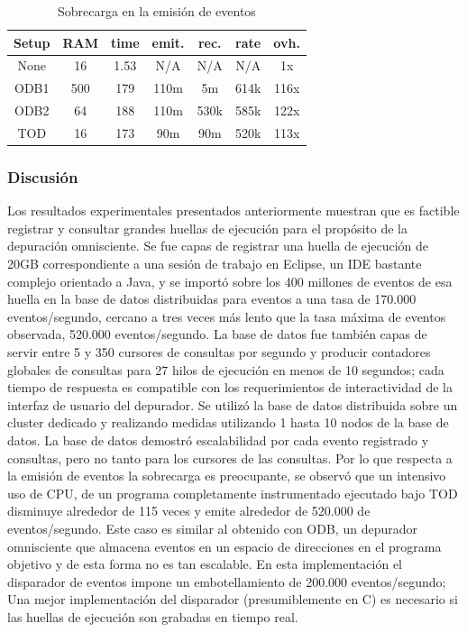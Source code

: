 \documentclass[12pt,legalpaper]{report}
\begin{document}
\begin{table}[!h]
\begin{center}
\begin{tabular}{| c | c | c | c | c | c | c |}
\hline
\rowcolor[gray]{0.9}Setup & RAM & time & emit. & rec. & rate & ovh.\\
\hline
None & 16 & 1.53 & N/A & N/A & N/A & 1x\\
\hline
ODB1 & 500 & 179 & 110m & 5m & 614k & 116x\\
\hline
ODB2 & 64 & 188 & 110m & 530k & 585k & 122x\\
\hline
TOD & 16 & 173 & 90m & 90m & 520k & 113x\\
\hline
\end{tabular}
\caption{Sobrecarga en la emisión de eventos}
\label{overheadEvents}
\end{center}
\end{table}

			\subsubsection{Discusión}

Los resultados experimentales presentados anteriormente muestran que es factible registrar y consultar grandes huellas de ejecución para el propósito de la depuración omnisciente.  Se fue capas de registrar una huella de ejecución de 20GB correspondiente a una sesión de trabajo en Eclipse, un IDE bastante complejo orientado a Java, y se importó sobre los 400 millones de eventos de esa huella en la base de datos distribuidas para eventos a una tasa de 170.000 eventos/segundo, cercano a tres veces más lento que la tasa máxima de eventos observada, 520.000 eventos/segundo.  La base de datos fue también capas de servir entre 5 y 350 cursores de consultas por segundo y producir contadores globales de consultas para 27 hilos de ejecución en menos de 10 segundos; cada tiempo de respuesta es compatible con los requerimientos de interactividad de la interfaz de usuario del depurador.  Se utilizó la base de datos distribuida sobre un cluster dedicado y realizando medidas utilizando 1 hasta 10 nodos de la base de datos.  La base de datos demostró escalabilidad por cada evento registrado y consultas, pero no tanto para los cursores de las consultas. Por lo que respecta a la emisión de eventos la sobrecarga es preocupante, se observó que un intensivo uso de CPU, de un programa completamente instrumentado ejecutado bajo TOD disminuye alrededor de 115 veces y emite alrededor de 520.000 de eventos/segundo.  Este caso es similar al obtenido con ODB, un depurador omnisciente que almacena eventos en un espacio de direcciones en el programa objetivo y de esta forma no es tan escalable.  En esta implementación el disparador de eventos impone un embotellamiento de 200.000 eventos/segundo; Una mejor implementación del disparador (presumiblemente en C) es necesario si las huellas de ejecución son grabadas en tiempo real.
\end{document}
